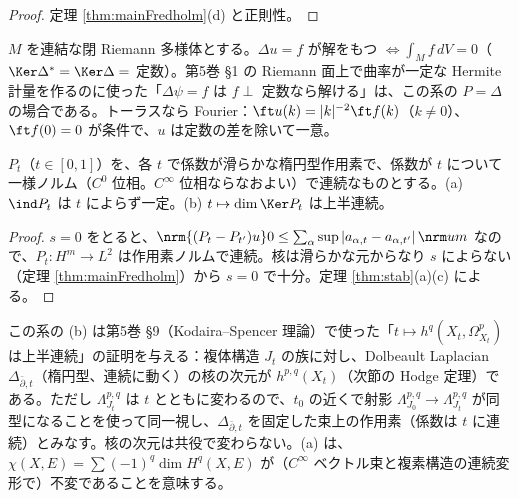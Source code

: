 \begin{proof}
定理 \ref{thm:mainFredholm}(d) と正則性。
\end{proof}
\begin{ex}\label{ex:poisson}
$M$ を連結な閉 Riemann 多様体とする。$\Delta u=f$ が解をもつ $\iff\int_Mf\,dV=0$（$\Ker\Delta^*=\Ker\Delta=$ 定数）。第5巻 \S1 の Riemann 面上で曲率が一定な Hermite 計量を作るのに使った「$\Delta\psi=f$ は $f\perp$ 定数なら解ける」は、この系の $P=\Delta$ の場合である。トーラスなら Fourier：$\ft u(k)=|k|^{-2}\ft f(k)$（$k\ne0$）、$\ft f(0)=0$ が条件で、$u$ は定数の差を除いて一意。
\end{ex}

\begin{cor}[連続族の指数と核の次元の上半連続性]\label{cor:family}\tP
$P_t$（$t\in[0,1]$）を、各 $t$ で係数が滑らかな楕円型作用素で、係数が $t$ について一様ノルム（$C^0$ 位相。$C^\infty$ 位相ならなおよい）で連続なものとする。(a) $\ind P_t$ は $t$ によらず一定。(b) $t\mapsto\dim\Ker P_t$ は上半連続。
\end{cor}
\begin{proof}
$s=0$ をとると、$\nrm{(P_t-P_{t'})u}0\le\sum_\alpha\sup|a_{\alpha,t}-a_{\alpha,t'}|\,\nrm u m$ なので、$P_t:H^m\to L^2$ は作用素ノルムで連続。核は滑らかな元からなり $s$ によらない（定理 \ref{thm:mainFredholm}）から $s=0$ で十分。定理 \ref{thm:stab}(a)(c) による。
\end{proof}
この系の (b) は第5巻 \S9（Kodaira--Spencer 理論）で使った「$t\mapsto h^q(X_t,\Omega^p_{X_t})$ は上半連続」の証明を与える：複体構造 $J_t$ の族に対し、Dolbeault Laplacian $\Delta_{\bar\partial,t}$（楕円型、連続に動く）の核の次元が $h^{p,q}(X_t)$（次節の Hodge 定理）である。ただし $\Lambda^{p,q}_{J_t}$ は $t$ とともに変わるので、$t_0$ の近くで射影 $\Lambda^{p,q}_{J_0}\to\Lambda^{p,q}_{J_t}$ が同型になることを使って同一視し、$\Delta_{\bar\partial,t}$ を固定した束上の作用素（係数は $t$ に連続）とみなす。核の次元は共役で変わらない。(a) は、$\chi(X,E)=\sum(-1)^q\dim H^q(X,E)$ が（$C^\infty$ ベクトル束と複素構造の連続変形で）不変であることを意味する。

